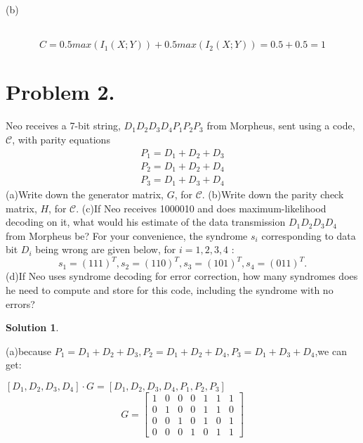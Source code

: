 \documentclass[UTF8,oneside]{article}
\newtheorem*{Solution}{Solution}
\begin{document}
(b)
\begin{center}
  \\
$$C=0.5max(I_1(X;Y))+0.5max(I_2(X;Y))=0.5+0.5=1$$
\end{center}


\section*{Problem 2.}
Neo receives a 7-bit string, $D_{1} D_{2} D_{3} D_{4} P_{1} P_{2} P_{3}$ from Morpheus, sent using a code, $\mathcal{C}$, with parity equations
$$
\begin{array}{l}
P_{1}=D_{1}+D_{2}+D_{3} \\
P_{2}=D_{1}+D_{2}+D_{4} \\
P_{3}=D_{1}+D_{3}+D_{4}
\end{array}
$$
(a)Write down the generator matrix, $G$, for $\mathcal{C}$.
(b)Write down the parity check matrix, $H$, for $\mathcal{C}$.
(c)If Neo receives 1000010 and does maximum-likelihood decoding on it, what would his estimate of the data transmission $D_{1} D_{2} D_{3} D_{4}$ from Morpheus be? For your convenience, the syndrome $s_{i}$ corresponding to data bit $D_{i}$ being wrong are given below, for $i=1,2,3,4$ :
$$
s_{1}=(111)^{T}, s_{2}=(110)^{T}, s_{3}=(101)^{T}, s_{4}=(011)^{T} .
$$
(d)If Neo uses syndrome decoding for error correction, how many syndromes does he need to compute and store for this code, including the syndrome with no errors?
\begin{Solution}
\end{Solution}
(a)because $P_{1}=D_{1}+D_{2}+D_{3},P_{2}=D_{1}+D_{2}+D_{4},P_{3}=D_{1}+D_{3}+D_{4}$,we can get:\\
\begin{center}
$[D_1,D_2,D_3,D_4]·G=[D_{1}, D_{2}, D_{3}, D_{4}, P_{1}, P_{2}, P_{3}]$\\
$$G=\left[\begin{array}{lllllll}
1 & 0 & 0 & 0 & 1 & 1 & 1 \\
0 & 1 & 0 & 0 & 1 & 1 & 0 \\
0 & 0 & 1 & 0 & 1 & 0 & 1 \\
0 & 0 & 0 & 1 & 0 & 1 & 1
\end{array}\right]
$$
\end{center}
\end{document}
